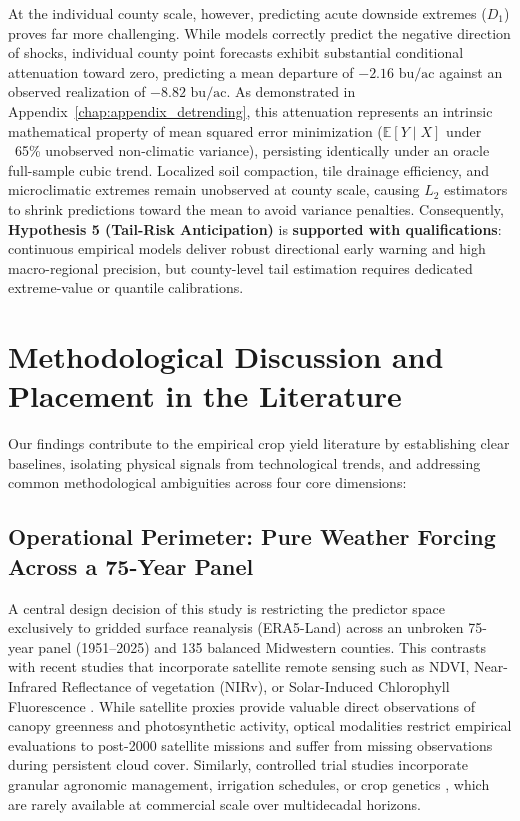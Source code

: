 At the individual county scale, however, predicting acute downside extremes ($D_1$) proves far more challenging. While models correctly predict the negative direction of shocks, individual county point forecasts exhibit substantial conditional attenuation toward zero, predicting a mean departure of $-2.16\text{ bu/ac}$ against an observed realization of $-8.82\text{ bu/ac}$. As demonstrated in Appendix~\ref{chap:appendix_detrending}, this attenuation represents an intrinsic mathematical property of mean squared error minimization ($\mathbb{E}[Y \mid X]$ under ~65\% unobserved non-climatic variance), persisting identically under an oracle full-sample cubic trend. Localized soil compaction, tile drainage efficiency, and microclimatic extremes remain unobserved at county scale, causing $L_2$ estimators to shrink predictions toward the mean to avoid variance penalties. Consequently, \textbf{Hypothesis 5 (Tail-Risk Anticipation)} is \textbf{supported with qualifications}: continuous empirical models deliver robust directional early warning and high macro-regional precision, but county-level tail estimation requires dedicated extreme-value or quantile calibrations.


\section{Methodological Discussion and Placement in the Literature}
\label{sec:disc_literature}

Our findings contribute to the empirical crop yield literature by establishing clear baselines, isolating physical signals from technological trends, and addressing common methodological ambiguities across four core dimensions:

\subsection{Operational Perimeter: Pure Weather Forcing Across a 75-Year Panel}
A central design decision of this study is restricting the predictor space exclusively to gridded surface reanalysis (ERA5-Land) across an unbroken 75-year panel (1951--2025) and 135 balanced Midwestern counties. This contrasts with recent studies that incorporate satellite remote sensing such as NDVI, Near-Infrared Reflectance of vegetation (NIRv), or Solar-Induced Chlorophyll Fluorescence \citep[SIF;][]{Xie2025, Yinetal2026}. While satellite proxies provide valuable direct observations of canopy greenness and photosynthetic activity, optical modalities restrict empirical evaluations to post-2000 satellite missions and suffer from missing observations during persistent cloud cover. Similarly, controlled trial studies incorporate granular agronomic management, irrigation schedules, or crop genetics \citep{Shooketal2021}, which are rarely available at commercial scale over multidecadal horizons.

